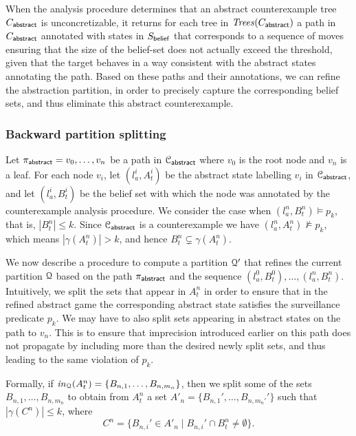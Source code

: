 \bigskip

When the analysis procedure determines that an abstract counterexample tree $C_{\mathsf{abstract}}$ is unconcretizable, it returns for each tree in $\mathit{Trees}(C_{\mathsf{abstract}})$ a path in $C_{\mathsf{abstract}}$ annotated with states in $S_{\mathsf{belief}}$ that corresponds to a sequence of moves ensuring that the size of the belief-set does not actually exceed the threshold, given that the target behaves in a way consistent with the abstract states annotating the path.  Based on these paths and their annotations, we can refine the abstraction partition, in order to precisely capture the corresponding belief sets, and thus eliminate this abstract counterexample.

\bigskip

\subsubsection{Backward partition splitting}
Let $\pi_{\mathsf{abstract}} = v_0,\ldots, v_n$ be a path in $\mathcal{C}_{\mathsf{abstract}}$ where $v_0$ is the root node and $v_n$ is a leaf. For each node $v_i$, let $(l_a^i,A_t^i) $ be the abstract state labelling $v_i$ in $\mathcal{C}_{\mathsf{abstract}}$, and let $(l_a^i,B_t^i)$ be the  belief set with which the node was annotated by the counterexample analysis procedure. We consider the case when $(l_a^n,B_t^n) \models p_k$, that is, $|B_t^n| \leq k$.
Since $\mathcal{C}_{\mathsf{abstract}}$ is a counterexample we have $(l_a^n,A_t^n) \not \models p_k$, which means $|\gamma(A_t^n)| > k$, and hence $B_t^n \subsetneq \gamma(A_t^n)$.

\bigskip

We now describe a procedure to compute a partition $\mathcal{Q}'$ that refines the current partition $\mathcal{Q}$ based on the path $\pi_{\mathsf{abstract}}$ and the sequence $(l_a^0,B_t^0),\ldots,(l_a^n,B_t^n)$. Intuitively, we split the sets that appear in $A_t^n$ in order to ensure that in the refined abstract game the corresponding abstract state satisfies the surveillance predicate $p_k$. We may have to also split sets appearing in abstract states on the path to $v_n$. This is to ensure that imprecision introduced earlier on this path does not propagate by including more than the desired newly split sets, and thus leading to the same violation of $p_k$.

Formally, if $\mathit{in}_{\mathcal{Q}}(A_t^n) = \{B_{n,1},\ldots,B_{n,m_n}\}$, then we split some of the sets $B_{n,1},\ldots,B_{n,m_n}$ to obtain from $A_t^n$ a set $A'_n = \{B_{n,1}',\ldots,B_{n,m_n'}'\}$ such that $|\gamma(C^n)| \leq k$, where  
$$C^n = \{B_{n,i}' \in A'_n \mid B_{n,i}' \cap B_t^n \neq \emptyset\}.$$

